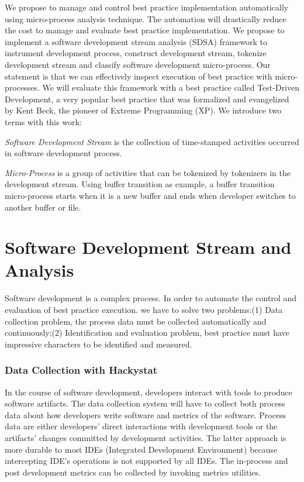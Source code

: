 We propose to manage and control best practice implementation automatically
using micro-process analysis technique. The automation will drastically
reduce the cost to manage and evaluate best practice implementation. We
propose to implement a software development stream analysis (SDSA)
framework to instrument development process, construct development stream,
tokenize development stream and classify software development
micro-process. Our statement is that we can effectively inspect execution
of best practice with micro-processes. We will evaluate this framework with
a best practice called Test-Driven Development, a very popular best
practice that was formalized and evangelized by Kent Beck, the pioneer of
Extreme Programming (XP). We introduce two terms with this work:
\begin{description}
\item \textit{Software Development Stream} is the collection of
  time-stamped activities occurred in software development process.
\item \textit{Micro-Process} is a group of activities that can be tokenized
  by tokenizers in the development stream. Using buffer transition as
  example, a buffer transition micro-process starts when it is a new buffer
  and ends when developer switches to another buffer or file.
\end{description}

\section{Software Development Stream and Analysis}
Software development is a complex process. In order to automate the control
and evaluation of best practice execution.  we have to solve two
problems:(1) Data collection problem, the process data must be collected
automatically and continuously;(2) Identification and evaluation problem,
best practice must have impressive characters to be identified and measured.

\subsubsection{Data Collection with Hackystat}
In the course of software development, developers interact with tools to produce
software artifacts. The data collection system will have to collect both process
data about how developers write software and metrics of the software. Process data 
are either developers' direct interactions with development tools or the 
artifacts' changes committed by development activities. The latter approach is 
more durable to most IDEs (Integrated Development Environment) because intercepting 
IDE's operations is not supported by all IDEs. The in-process and post development 
metrics can be collected by invoking metrics utilities. 

